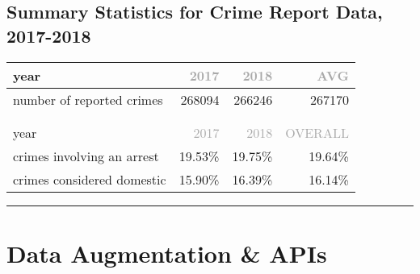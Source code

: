 \documentclass[11pt]{article}
\newcommand{\printsubsection}[1]{\normalfont\headerfontlt\textcolor{darkgray}{{#1}}}
\newcommand{\opns}[1]{\textrm{\small\printsubsection{\MakeUppercase{#1}}}}
\begin{document}
\subsection{Summary Statistics for Crime Report Data, 2017-2018}

\begin{table}[H]
\centering \renewcommand{\arraystretch}{1.2}
\begin{tabular}{lrrr}
\multicolumn{1}{l|}{year} &    \opns{2017} &    \opns{2018} &     \opns{AVG} \\\hline
\multicolumn{1}{l|}{number of reported crimes} &  268094 &  266246 &  267170 \\
\\ \\
\multicolumn{1}{l|}{year} &       \opns{2017} &  \opns{2018} &  \opns{OVERALL} \\\hline
\multicolumn{1}{l|}{crimes involving an arrest}   &  19.53\% &  19.75\% &  19.64\% \\
\multicolumn{1}{l|}{crimes considered domestic}   &  15.90\% &  16.39\% &  16.14\% 
\end{tabular}
\end{table}


{\centering
\hspace{-1in}
\vspace{4ex}\hrule\vspace{4ex}
\hspace{-1in}
\par}
\section{Data Augmentation \& APIs}
\end{document}
